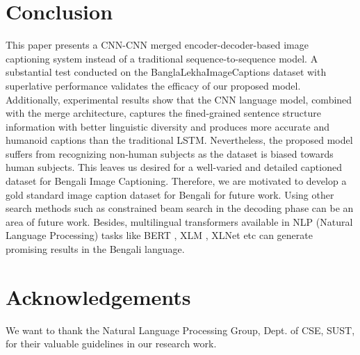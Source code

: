 \documentclass[runningheads]{llncs}
\begin{document}
\section{Conclusion}
This paper presents a CNN-CNN merged encoder-decoder-based image captioning system instead of a traditional sequence-to-sequence model. A substantial test conducted on the BanglaLekhaImageCaptions dataset with superlative performance validates the efficacy of our proposed model. Additionally, experimental results show that the CNN language model, combined with the merge architecture, captures the fined-grained sentence structure information with better linguistic diversity and produces more accurate and humanoid captions than the traditional LSTM. Nevertheless, the proposed model suffers from recognizing non-human subjects as the dataset is biased towards human subjects. This leaves us desired for a well-varied and detailed captioned dataset for Bengali Image Captioning. Therefore, we are motivated to develop a gold standard image caption dataset for Bengali for future work. Using other search methods such as constrained beam search in the decoding phase can be an area of future work. Besides, multilingual transformers available in NLP (Natural Language Processing) tasks like BERT \cite{bert}, XLM \cite{xlm}, XLNet \cite{xlnet} etc can generate promising results in the Bengali language.

\section{Acknowledgements}
We want to thank the Natural Language Processing Group, Dept. of CSE, SUST, for their valuable guidelines in our research work.



\end{document}
